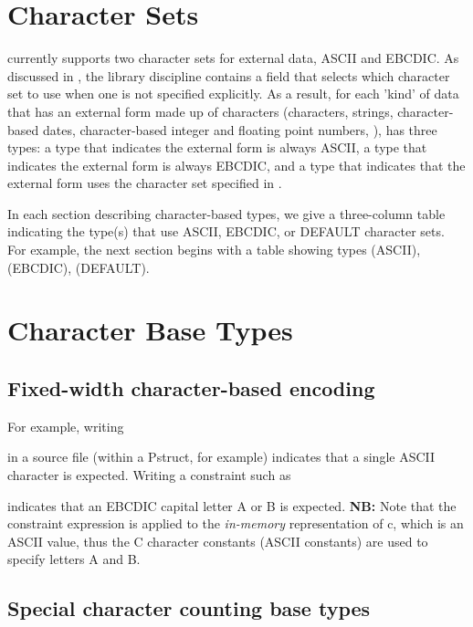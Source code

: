 \section{Character Sets}

\PADSL{} currently supports two character sets for external data, ASCII and EBCDIC.
As discussed in , the library
discipline contains a field
 that selects which character set to use when
one is not specified explicitly.  As a result, for each 'kind' of data
that has an external form made up of characters (characters, strings,
character-based dates, character-based integer and floating point
numbers, \etc{}), \PADSL{} has three types: a type that indicates the external
form is always ASCII, a type that indicates the external form is
always EBCDIC, and a type that indicates that the external form uses
the character set specified in .

In each section describing character-based types, we give a
three-column table indicating the type(s) that use ASCII, EBCDIC, or
DEFAULT character sets.  For example, the next section begins with a
table showing types  (ASCII),  (EBCDIC), 
(DEFAULT).

\section{Character Base Types}

\subsection{Fixed-width character-based encoding}

\aedBegin{}
\aedEnd{}
\myvskip{1ex}

\noindent
For example,  writing

%
\noindent
in a \PADSL{} source file (within a Pstruct, for example) indicates
that a single ASCII character is expected.  Writing a constraint
such as 

%
\noindent
indicates that an EBCDIC capital letter A or B is expected.
{\bf NB:}\/ Note that the constraint expression is applied to the
{\em in-memory\/} representation of c, which is an ASCII value,
thus the C character constants (ASCII constants)
are used to specify letters A and B.

\subsection{Special character counting base types}

